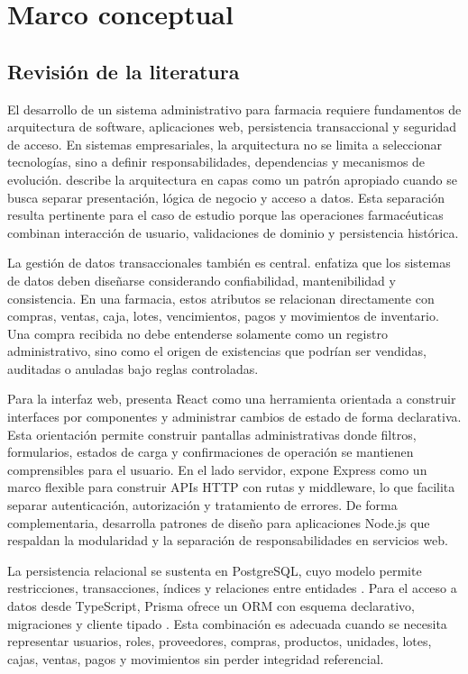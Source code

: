 \chapter{Marco conceptual}

\section{Revisión de la literatura}

El desarrollo de un sistema administrativo para farmacia requiere fundamentos de arquitectura de software, aplicaciones web, persistencia transaccional y seguridad de acceso. En sistemas empresariales, la arquitectura no se limita a seleccionar tecnologías, sino a definir responsabilidades, dependencias y mecanismos de evolución. \textcite{richards2015architecture} describe la arquitectura en capas como un patrón apropiado cuando se busca separar presentación, lógica de negocio y acceso a datos. Esta separación resulta pertinente para el caso de estudio porque las operaciones farmacéuticas combinan interacción de usuario, validaciones de dominio y persistencia histórica.

La gestión de datos transaccionales también es central. \textcite{kleppmann2017data} enfatiza que los sistemas de datos deben diseñarse considerando confiabilidad, mantenibilidad y consistencia. En una farmacia, estos atributos se relacionan directamente con compras, ventas, caja, lotes, vencimientos, pagos y movimientos de inventario. Una compra recibida no debe entenderse solamente como un registro administrativo, sino como el origen de existencias que podrían ser vendidas, auditadas o anuladas bajo reglas controladas.

Para la interfaz web, \textcite{banks2020learning} presenta React como una herramienta orientada a construir interfaces por componentes y administrar cambios de estado de forma declarativa. Esta orientación permite construir pantallas administrativas donde filtros, formularios, estados de carga y confirmaciones de operación se mantienen comprensibles para el usuario. En el lado servidor, \textcite{mardan2014express} expone Express como un marco flexible para construir APIs HTTP con rutas y middleware, lo que facilita separar autenticación, autorización y tratamiento de errores. De forma complementaria, \textcite{casciaro2020node} desarrolla patrones de diseño para aplicaciones Node.js que respaldan la modularidad y la separación de responsabilidades en servicios web.

La persistencia relacional se sustenta en PostgreSQL, cuyo modelo permite restricciones, transacciones, índices y relaciones entre entidades \parencite{postgresql2026docs}. Para el acceso a datos desde TypeScript, Prisma ofrece un ORM con esquema declarativo, migraciones y cliente tipado \parencite{prisma2026docs}. Esta combinación es adecuada cuando se necesita representar usuarios, roles, proveedores, compras, productos, unidades, lotes, cajas, ventas, pagos y movimientos sin perder integridad referencial.

